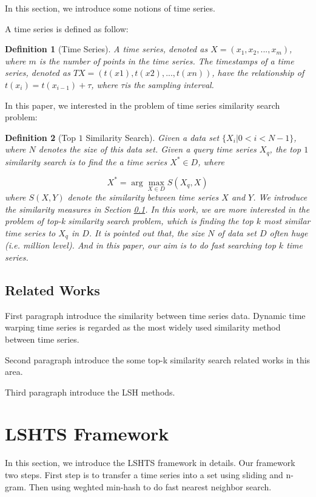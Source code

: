 \documentclass{article}
\newtheorem{definition}{Definition}
\begin{document}
In this section, we introduce some notions of time series. 

A time series is defined as follow:
\begin{definition}[Time Series]
A time series, denoted as $X = (x_1,x_2,...,x_m)$, where $m$ is the number of points in the time series. The timestamps of a time series, denoted as $TX = (t(x1), t(x2),..., t(xn))$, have the relationship of $t(x_i) = t(x_{i-1})+\tau$, where $\tau$is the sampling interval.
\end{definition}

In this paper, we interested in the problem of time series similarity search problem:
\begin{definition}[Top $1$ Similarity Search]
Given a data set $\{X_i|0<i<N-1\}$, where $N$ denotes the size of this data set. Given a query time series $X_q$, the top $1$ similarity search is to find the a time series $X^* \in D$, where

\[
X^* = \arg \max_{X \in D} S(X_q,X)
\]
where $S(X,Y)$ denote the similarity between time series $X$ and $Y$. We introduce the similarity measures in Section \ref{relatedwork}. In this work, we are more interested in the problem of top-k similarity search problem, which is finding the top $k$ most similar time series to $X_q$ in $D$. It is pointed out that, the size $N$ of data set $D$ often huge (i.e. million level). And in this paper, our aim is to do fast searching top $k$ time series.

\end{definition}

\subsection{Related Works}
\label{relatedwork}

First paragraph introduce the similarity between time series data.
Dynamic time warping \cite{rakthanmanon2012searching} time series is regarded as the most widely used similarity method between time series. 

Second paragraph introduce the some top-k similarity search related works in this area.

Third paragraph introduce the LSH methods.


\section{LSHTS Framework}
In this section, we introduce the LSHTS framework in details. Our framework two steps. First step is to transfer a time series into a set using sliding and n-gram.
Then using weghted min-hash to do fast nearest neighbor search.
\end{document}
